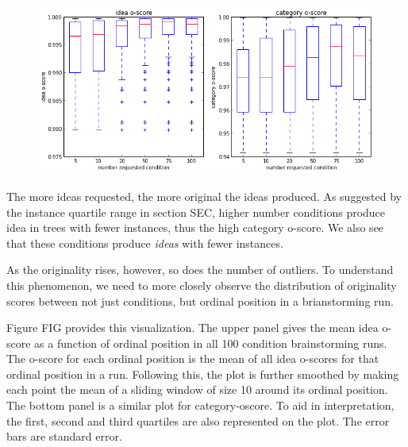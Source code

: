 \begin{figure}[h!]
    \centering
    \includegraphics[width=0.9\columnwidth]{oscores_conditions}
\end{figure}

The more ideas requested, the more original the ideas produced. As suggested by the instance quartile range in section SEC, higher number conditions produce idea in trees with fewer instances, thus the high category o-score. We also see that these conditions produce \emph{ideas} with fewer instances.

As the originality rises, however, so does the number of outliers. To understand this phenomenon, we need to more closely observe the distribution of originality scores between not just conditions, but ordinal position in a brianstorming run.

Figure FIG provides this visualization. The upper panel gives the mean idea o-score as a function of ordinal position in all 100 condition brainstorming runs. The o-score for each ordinal position is the mean of all idea o-scores for that ordinal position in a run. Following this, the plot is further smoothed by making each point the mean of a sliding window of size 10 around its ordinal position. The bottom panel is a similar plot for category-oscore. To aid in interpretation, the first, second and third quartiles are also represented on the plot. The error bars are standard error.


